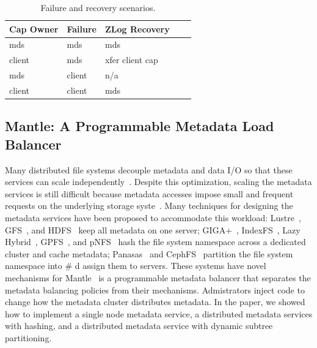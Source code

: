 \documentclass[10pt,twocolumn]{article}
\begin{document}
\begin{table}
\begin{tabular}{ | l | l | l | l | l |}
\hline
Cap Owner & Failure & ZLog Recovery \\ \hline
mds & mds & mds \\ \hline
client & mds & xfer client cap \\ \hline
mds & client & n/a \\ \hline
client & client & mds \\
\hline
\end{tabular}
\caption{Failure and recovery scenarios.}
\label{t:mds-zlog-fail}
\end{table}

\subsection{Mantle: A Programmable Metadata Load
Balancer}\label{mantle-a-programmable-metadata-load-balancer}

Many distributed file systems decouple metadata and data I/O so that
these services can scale independently~\cite{alam:pdsw2011-metadata-scaling,ghemawat:sosp2003-gfs,hildebrand:msst2005-pnfs,weil_ceph_2006,welch:fast2008-panasas,shvachko:login2012-hdfs-scalability}. Despite
this optimization, scaling the metadata services is still difficult
because metadata accesses impose small and frequent requests on the
underlying storage syste~\cite{roselli:atec2000-FS-workloads}. Many
techniques for designing the metadata services have been proposed to
accommodate this workload: Lustre~\cite{konstantinos:pdsw2014-lustre-metadata}, GFS~\cite{ghemawat:sosp2003-gfs}, and HDFS~\cite{shvachko:login2012-hdfs-scalability} keep all metadata on one
server; GIGA+~\cite{patil:fast2011-giga}, IndexFS~\cite{ren:sc2014-indexfs}, Lazy Hybrid~\cite{brandt:msst2003-lh}, GPFS~\cite{schmuck:fast2002-gpfs},
and pNFS~\cite{hildebrand:supercomputing2006-pNFS} hash the file
system namespace across a dedicated cluster and cache metadata; Panasas~\cite{welch:fast2008-panasas} and CephFS~\cite{weil:sc2004-dyn-metadata} partition the file system namespace
into \# d assign them to servers. These systems have novel mechanisms
for Mantle~\cite{sevilla:sc15-mantle} is a programmable metadata
balancer that separates the metadata balancing policies from their
mechanisms. Admistrators inject code to change how the metadata cluster
distributes metadata. In the paper, we showed how to implement a single
node metadata service, a distributed metadata services with hashing, and
a distributed metadata service with dynamic subtree partitioning.
\end{document}
